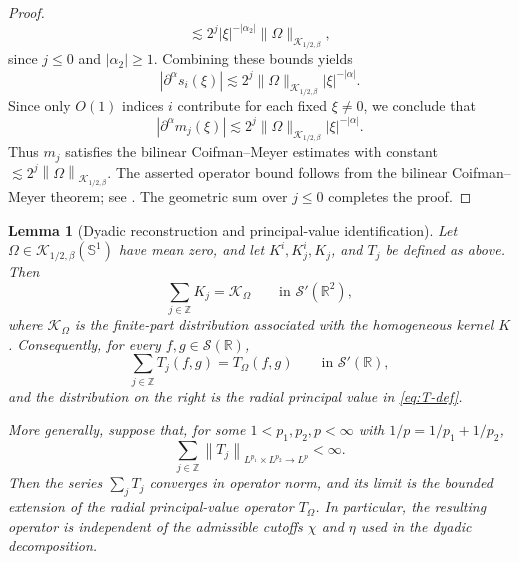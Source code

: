 \documentclass[11pt]{amsart}
\newtheorem{lemma}[definition]{Lemma}
\theoremstyle{remark}
\numberwithin{equation}{section}
\newcommand{\R}{\mathbb R}
\newcommand{\Sph}{\mathbb S^1}
\newcommand{\cK}{\mathcal K}
\newcommand{\norm}[1]{\left\lVert #1\right\rVert}
\begin{document}
\begin{proof}
\[		\lesssim
		2^j|\xi|^{-|\alpha_2|}\|\Omega\|_{\cK_{1/2,\beta}},
		\]
		since \(j\le0\) and \(|\alpha_2|\ge1\). Combining these bounds yields
		\[
		|\partial^\alpha s_i(\xi)|
		\lesssim
		2^j\|\Omega\|_{\cK_{1/2,\beta}}|\xi|^{-|\alpha|}.
		\]
		Since only \(O(1)\) indices \(i\) contribute for each fixed \(\xi\ne0\), we conclude that
		\[
		|\partial^\alpha m_j(\xi)|
		\lesssim
		2^j\|\Omega\|_{\cK_{1/2,\beta}}|\xi|^{-|\alpha|}.
		\]
		Thus \(m_j\) satisfies the bilinear Coifman--Meyer estimates with constant
		\(\lesssim 2^j\norm{\Omega}_{\cK_{1/2,\beta}}\). The asserted operator bound
		follows from the bilinear Coifman--Meyer theorem; see
		\cite{GrafakosTorres2002}. The geometric sum over \(j\le0\) completes the proof.
	\end{proof}
	
	\begin{lemma}[Dyadic reconstruction and principal-value identification]
		\label{lem:dyadic-reconstruction}
		Let \(\Omega\in\cK_{1/2,\beta}(\Sph)\) have mean zero, and let
		\(K^i,K_j^i,K_j\), and \(T_j\) be defined as above. Then
		\[
		\sum_{j\in\mathbb Z}K_j=\mathcal K_\Omega
		\qquad\text{in }\mathcal S'(\R^2),
		\]
		where \(\mathcal K_\Omega\) is the finite-part distribution associated with
		the homogeneous kernel \(K\). Consequently, for every
		\(f,g\in\mathcal S(\R)\),
		\[
		\sum_{j\in\mathbb Z}T_j(f,g)=T_\Omega(f,g)
		\qquad\text{in }\mathcal S'(\R),
		\]
		and the distribution on the right is the radial principal value in
		\eqref{eq:T-def}.
		
		More generally, suppose that, for some
		\(1<p_1,p_2,p<\infty\) with \(1/p=1/p_1+1/p_2\),
		\[
		\sum_{j\in\mathbb Z}
		\norm{T_j}_{L^{p_1}\times L^{p_2}\to L^p}<\infty.
		\]
	Then the series \(\sum_jT_j\) converges in operator norm, and its limit is
		the bounded extension of the radial principal-value operator \(T_\Omega\).
		In particular, the resulting operator is independent of the admissible
		cutoffs \(\chi\) and \(\eta\) used in the dyadic decomposition.
	\end{lemma}
	
\end{document}
